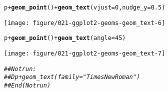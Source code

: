 \documentclass[a4paper,titlepage]{tufte-handout}\usepackage[]{graphicx}\usepackage[]{color}
\makeatletter
\def\maxwidth{ %
  \ifdim\Gin@nat@width>\linewidth
    \linewidth
  \else
    \Gin@nat@width
  \fi
}
\newcommand{\hlnum}[1]{\textcolor[rgb]{0.686,0.059,0.569}{#1}}%
\newcommand{\hlcom}[1]{\textcolor[rgb]{0.678,0.584,0.686}{\textit{#1}}}%
\newcommand{\hlopt}[1]{\textcolor[rgb]{0,0,0}{#1}}%
\newcommand{\hlstd}[1]{\textcolor[rgb]{0.345,0.345,0.345}{#1}}%
\newcommand{\hlkwc}[1]{\textcolor[rgb]{0.333,0.667,0.333}{#1}}%
\newcommand{\hlkwd}[1]{\textcolor[rgb]{0.737,0.353,0.396}{\textbf{#1}}}%
\newenvironment{kframe}{%
 \def\at@end@of@kframe{}%
 \ifinner\ifhmode%
  \def\at@end@of@kframe{\end{minipage}}%
  \begin{minipage}{\columnwidth}%
 \fi\fi%
 \def\FrameCommand##1{\hskip\@totalleftmargin \hskip-\fboxsep
 \colorbox{shadecolor}{##1}\hskip-\fboxsep
     \hskip-\linewidth \hskip-\@totalleftmargin \hskip\columnwidth}%
 \MakeFramed {\advance\hsize-\width
   \@totalleftmargin\z@ \linewidth\hsize
   \@setminipage}}%
 {\par\unskip\endMakeFramed%
 \at@end@of@kframe}
\newenvironment{knitrout}{}{} %
\makeatother
\begin{document}
\begin{knitrout}
\begin{kframe}
\begin{alltt}
\hlstd{p} \hlopt{+} \hlkwd{geom_point}\hlstd{()} \hlopt{+} \hlkwd{geom_text}\hlstd{(}\hlkwc{vjust} \hlstd{=} \hlnum{0}\hlstd{,} \hlkwc{nudge_y} \hlstd{=} \hlnum{0.5}\hlstd{)}
\end{alltt}
\end{kframe}
\texttt{[image: figure/021-ggplot2-geoms-geom\_text-6]} 
\begin{kframe}\begin{alltt}
\hlstd{p} \hlopt{+} \hlkwd{geom_point}\hlstd{()} \hlopt{+} \hlkwd{geom_text}\hlstd{(}\hlkwc{angle} \hlstd{=} \hlnum{45}\hlstd{)}
\end{alltt}
\end{kframe}
\texttt{[image: figure/021-ggplot2-geoms-geom\_text-7]} 
\begin{kframe}\begin{alltt}
\hlcom{## Not run: }
\hlcom{##D p + geom_text(family = "Times New Roman")}
\hlcom{## End(Not run)}


\end{alltt}
\end{kframe}
\end{knitrout}
\end{document}
